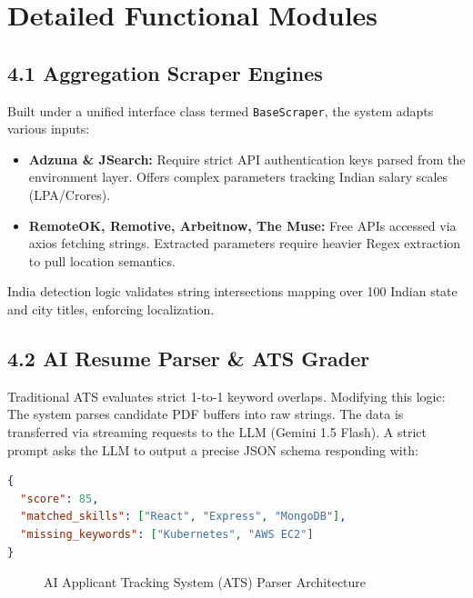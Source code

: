 \documentclass[12pt,a4paper,oneside]{report}
\begin{document}
\chapter{Detailed Functional Modules}

\section{4.1 Aggregation Scraper Engines}
Built under a unified interface class termed \texttt{BaseScraper}, the system adapts various inputs:
\begin{itemize}
    \item \textbf{Adzuna \& JSearch:} Require strict API authentication keys parsed from the environment layer. Offers complex parameters tracking Indian salary scales (LPA/Crores).
    \item \textbf{RemoteOK, Remotive, Arbeitnow, The Muse:} Free APIs accessed via axios fetching strings. Extracted parameters require heavier Regex extraction to pull location semantics.
\end{itemize}
India detection logic validates string intersections mapping over 100 Indian state and city titles, enforcing localization.

\section{4.2 AI Resume Parser \& ATS Grader}
Traditional ATS evaluates strict 1-to-1 keyword overlaps. Modifying this logic:
The system parses candidate PDF buffers into raw strings. The data is transferred via streaming requests to the LLM (Gemini 1.5 Flash). A strict prompt asks the LLM to output a precise JSON schema responding with:
\begin{lstlisting}[language=json, caption=LLM Desired Return Entity]
{
  "score": 85,
  "matched_skills": ["React", "Express", "MongoDB"],
  "missing_keywords": ["Kubernetes", "AWS EC2"]
}
\end{lstlisting}

\vspace{0.5cm}
\begin{figure}[H]
    \centering
    \caption{AI Applicant Tracking System (ATS) Parser Architecture}
    \label{fig:ai_parser}
\end{figure}
\end{document}
